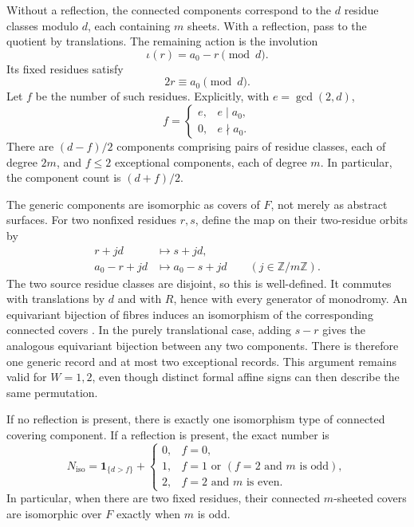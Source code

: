 Without a reflection, the connected components correspond to the $d$
residue classes modulo $d$, each containing $m$ sheets.  With a
reflection, pass to the quotient by translations.  The remaining action
is the involution
\[
 \iota(r)=a_0-r\pmod d.
\]
Its fixed residues satisfy
\begin{equation}
 2r\equiv a_0\pmod d.
 \label{eq:dihedral-fixed}
\end{equation}
Let $f$ be the number of such residues.  Explicitly, with
$e=\gcd(2,d)$,
\[
 f=\begin{cases}e,&e\mid a_0,\\0,&e\nmid a_0.\end{cases}
\]
There are $(d-f)/2$ components comprising pairs of residue classes,
each of degree $2m$, and $f\leq 2$ exceptional components, each of
degree $m$.  In particular, the component count is $(d+f)/2$.

The generic components are isomorphic as covers of $F$, not merely as
abstract surfaces.  For two nonfixed residues $r,s$, define the map on
their two-residue orbits by
\begin{align*}
 r+jd&\longmapsto s+jd,\\
 a_0-r+jd&\longmapsto a_0-s+jd
 \qquad (j\in\mathbb Z/m\mathbb Z).
\end{align*}
The two source residue classes are disjoint, so this is well-defined.
It commutes with translations by $d$ and with $R$, hence with every
generator of monodromy.  An equivariant bijection of fibres induces an
isomorphism of the corresponding connected covers
\cite[Section~1.3]{Hatcher2002}.  In the purely
translational case, adding $s-r$ gives the analogous equivariant
bijection between any two components.  There is therefore one generic
record and at most two exceptional records.  This argument remains
valid for $W=1,2$, even though distinct formal affine signs can then
describe the same permutation.

\begin{corollary}
\label{cor:dihedral-exact-types}
If no reflection is present, there is exactly one isomorphism type of
connected covering component.  If a reflection is present, the exact
number is
\[
 N_{\mathrm{iso}}=\mathbf 1_{\{d>f\}}+
 \begin{cases}
 0,&f=0,\\
 1,&f=1\text{ or }(f=2\text{ and }m\text{ is odd}),\\
 2,&f=2\text{ and }m\text{ is even}.
 \end{cases}
\]
In particular, when there are two fixed residues, their connected
$m$-sheeted covers are isomorphic over $F$ exactly when $m$ is odd.
\end{corollary}

